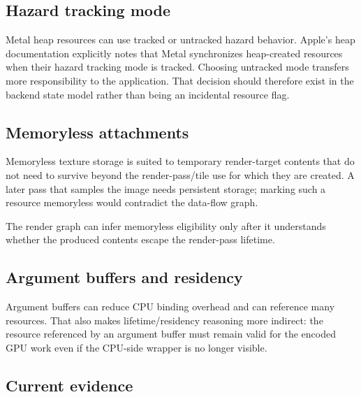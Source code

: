 \subsection{Hazard tracking mode}\label{appendix-563b2cb23fc3-hazard-tracking-mode}

\hypertarget{appendix-563b2cb23fc3-hazard-tracking-mode}{}

Metal heap resources can use tracked or untracked hazard behavior. Apple's heap documentation explicitly notes that Metal synchronizes heap-created resources when their hazard tracking mode is tracked. Choosing untracked mode transfers more responsibility to the application. That decision should therefore exist in the backend state model rather than being an incidental resource flag.

\subsection{Memoryless attachments}\label{appendix-563b2cb23fc3-memoryless-attachments}

\hypertarget{appendix-563b2cb23fc3-memoryless-attachments}{}

Memoryless texture storage is suited to temporary render-target contents that do not need to survive beyond the render-pass/tile use for which they are created. A later pass that samples the image needs persistent storage; marking such a resource memoryless would contradict the data-flow graph.

The render graph can infer memoryless eligibility only after it understands whether the produced contents escape the render-pass lifetime.

\subsection{Argument buffers and residency}\label{appendix-563b2cb23fc3-argument-buffers-and-residency}

\hypertarget{appendix-563b2cb23fc3-argument-buffers-and-residency}{}

Argument buffers can reduce CPU binding overhead and can reference many resources. That also makes lifetime/residency reasoning more indirect: the resource referenced by an argument buffer must remain valid for the encoded GPU work even if the CPU-side wrapper is no longer visible.

\subsection{Current evidence}\label{appendix-563b2cb23fc3-current-evidence}

